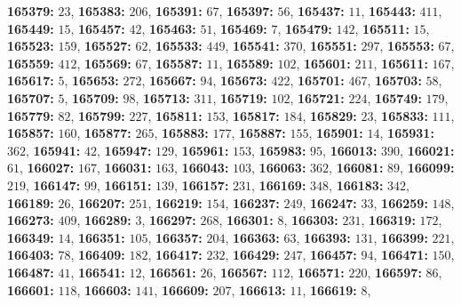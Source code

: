\textsf{\bfseries 165379:} $23$, \textsf{\bfseries 165383:} $206$, \textsf{\bfseries 165391:} $67$, \textsf{\bfseries 165397:} $56$, \textsf{\bfseries 165437:} $11$, \textsf{\bfseries 165443:} $411$, \textsf{\bfseries 165449:} $15$, \textsf{\bfseries 165457:} $42$, \textsf{\bfseries 165463:} $51$, \textsf{\bfseries 165469:} $7$, \textsf{\bfseries 165479:} $142$, \textsf{\bfseries 165511:} $15$, \textsf{\bfseries 165523:} $159$, \textsf{\bfseries 165527:} $62$, \textsf{\bfseries 165533:} $449$, \textsf{\bfseries 165541:} $370$, \textsf{\bfseries 165551:} $297$, \textsf{\bfseries 165553:} $67$, \textsf{\bfseries 165559:} $412$, \textsf{\bfseries 165569:} $67$, \textsf{\bfseries 165587:} $11$, \textsf{\bfseries 165589:} $102$, \textsf{\bfseries 165601:} $211$, \textsf{\bfseries 165611:} $167$, \textsf{\bfseries 165617:} $5$, \textsf{\bfseries 165653:} $272$, \textsf{\bfseries 165667:} $94$, \textsf{\bfseries 165673:} $422$, \textsf{\bfseries 165701:} $467$, \textsf{\bfseries 165703:} $58$, \textsf{\bfseries 165707:} $5$, \textsf{\bfseries 165709:} $98$, \textsf{\bfseries 165713:} $311$, \textsf{\bfseries 165719:} $102$, \textsf{\bfseries 165721:} $224$, \textsf{\bfseries 165749:} $179$, \textsf{\bfseries 165779:} $82$, \textsf{\bfseries 165799:} $227$, \textsf{\bfseries 165811:} $153$, \textsf{\bfseries 165817:} $184$, \textsf{\bfseries 165829:} $23$, \textsf{\bfseries 165833:} $111$, \textsf{\bfseries 165857:} $160$, \textsf{\bfseries 165877:} $265$, \textsf{\bfseries 165883:} $177$, \textsf{\bfseries 165887:} $155$, \textsf{\bfseries 165901:} $14$, \textsf{\bfseries 165931:} $362$, \textsf{\bfseries 165941:} $42$, \textsf{\bfseries 165947:} $129$, \textsf{\bfseries 165961:} $153$, \textsf{\bfseries 165983:} $95$, \textsf{\bfseries 166013:} $390$, \textsf{\bfseries 166021:} $61$, \textsf{\bfseries 166027:} $167$, \textsf{\bfseries 166031:} $163$, \textsf{\bfseries 166043:} $103$, \textsf{\bfseries 166063:} $362$, \textsf{\bfseries 166081:} $89$, \textsf{\bfseries 166099:} $219$, \textsf{\bfseries 166147:} $99$, \textsf{\bfseries 166151:} $139$, \textsf{\bfseries 166157:} $231$, \textsf{\bfseries 166169:} $348$, \textsf{\bfseries 166183:} $342$, \textsf{\bfseries 166189:} $26$, \textsf{\bfseries 166207:} $251$, \textsf{\bfseries 166219:} $154$, \textsf{\bfseries 166237:} $249$, \textsf{\bfseries 166247:} $33$, \textsf{\bfseries 166259:} $148$, \textsf{\bfseries 166273:} $409$, \textsf{\bfseries 166289:} $3$, \textsf{\bfseries 166297:} $268$, \textsf{\bfseries 166301:} $8$, \textsf{\bfseries 166303:} $231$, \textsf{\bfseries 166319:} $172$, \textsf{\bfseries 166349:} $14$, \textsf{\bfseries 166351:} $105$, \textsf{\bfseries 166357:} $204$, \textsf{\bfseries 166363:} $63$, \textsf{\bfseries 166393:} $131$, \textsf{\bfseries 166399:} $221$, \textsf{\bfseries 166403:} $78$, \textsf{\bfseries 166409:} $182$, \textsf{\bfseries 166417:} $232$, \textsf{\bfseries 166429:} $247$, \textsf{\bfseries 166457:} $94$, \textsf{\bfseries 166471:} $150$, \textsf{\bfseries 166487:} $41$, \textsf{\bfseries 166541:} $12$, \textsf{\bfseries 166561:} $26$, \textsf{\bfseries 166567:} $112$, \textsf{\bfseries 166571:} $220$, \textsf{\bfseries 166597:} $86$, \textsf{\bfseries 166601:} $118$, \textsf{\bfseries 166603:} $141$, \textsf{\bfseries 166609:} $207$, \textsf{\bfseries 166613:} $11$, \textsf{\bfseries 166619:} $8$, 
